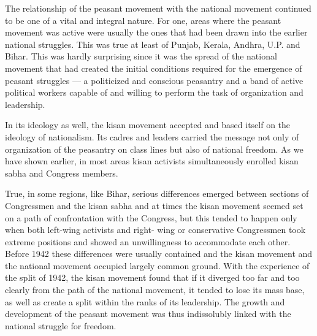The relationship of the peasant movement with the national movement continued to be one of a vital and integral nature. For one, areas where the peasant movement was active were usually the ones that had been drawn into the earlier national struggles. This was true at least of Punjab, Kerala, Andhra, U.P. and Bihar. This was hardly surprising since it was the spread of the national movement that had created the initial conditions required for the emergence of peasant struggles --- a politicized and conscious peasantry and a band of active political workers capable of and willing to perform the task of organization and leadership.

In its ideology as well, the kisan movement accepted and based itself on the ideology of nationalism. Its cadres and leaders carried the message not only of organization of the peasantry on class lines but also of national freedom. As we have shown earlier, in most areas kisan activists simultaneously enrolled kisan sabha and Congress members.

True, in some regions, like Bihar, serious differences emerged between sections of Congressmen and the kisan sabha and at times the kisan movement seemed set on a path of confrontation with the Congress, but this tended to happen only when both left-wing activists and right- wing or conservative Congressmen took extreme positions and showed an unwillingness to accommodate each other. Before 1942 these differences were usually contained and the kisan movement and the national movement occupied largely common ground. With the experience of the split of 1942, the kisan movement found that if it diverged too far and too clearly from the path of the national movement, it tended to lose its mass base, as well as create a split within the ranks of its leadership. The growth and development of the peasant movement was thus indissolubly linked with the national struggle for freedom.
